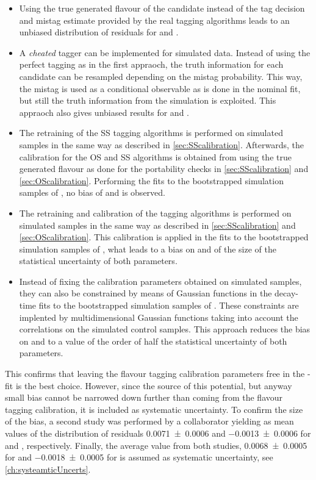 \begin{itemize}
	\item Using the true generated flavour of the \B candidate instead of the tag decision and mistag estimate provided by the real tagging algorithms leads to an unbiased distribution of residuals for \Sf and \Sfbar.
	\item A \emph{cheated} tagger can be implemented for simulated data.
	Instead of using the perfect tagging as in the first appraoch, the truth information for each candidate can be resampled depending on the mistag probability.
	This way, the mistag is used as a conditional observable as is done in the nominal fit, but still the truth information from the simulation is exploited.
	This appraoch also gives unbiased results for \Sf and \Sfbar.
	\item The retraining of the SS tagging algorithms is performed on simulated samples in the same way as described in \cref{sec:SScalibration}.
	Afterwards, the calibration for the OS and SS algorithms is obtained from \BdToDpi using the true generated flavour as done for the portability checks in \cref{sec:SScalibration} and \cref{sec:OScalibration}.
	Performing the fits to the bootstrapped simulation samples of \BdToDpi, no bias of \Sf and \Sfbar is observed.
	\item The retraining and calibration of the tagging algorithms is performed on simulated samples in the same way as described in \cref{sec:SScalibration} and \cref{sec:OScalibration}.
	This calibration is applied in the fits to the bootstrapped simulation samples of \BdToDpi, what leads to a bias on \Sf and \Sfbar of the size of the statistical uncertainty of both parameters.
	\item Instead of fixing the calibration parameters obtained on simulated samples, they can also be constrained by means of Gaussian functions in the decay-time fits to the  bootstrapped simulation samples of \BdToDpi .
	These constraints are implented by multidimensional Gaussian functions taking into account the correlations on the simulated control samples.
	This approach reduces the bias on \Sf and \Sfbar to a value of the order of half the statistical uncertainty of both parameters.
\end{itemize}
This confirms that leaving the flavour tagging calibration parameters free in the \CP-fit is the best choice.
However, since the source of this potential, but anyway small bias cannot be narrowed down further than coming from the flavour tagging calibration, it is included as systematic uncertainty.
To confirm the size of the bias, a second study was performed by a collaborator yielding as mean values of the distribution of residuals \num{0.0071\pm0.0006} and \num{-0.0013\pm0.0006} for \Sf and \Sfbar, respectively.
Finally, the average value from both studies, \ie \num{0.0068\pm0.0005} for \Sf and \num{-0.0018\pm0.0005} for \Sfbar is assumed as systematic uncertainty, see \cref{ch:systeamticUncerts}.

